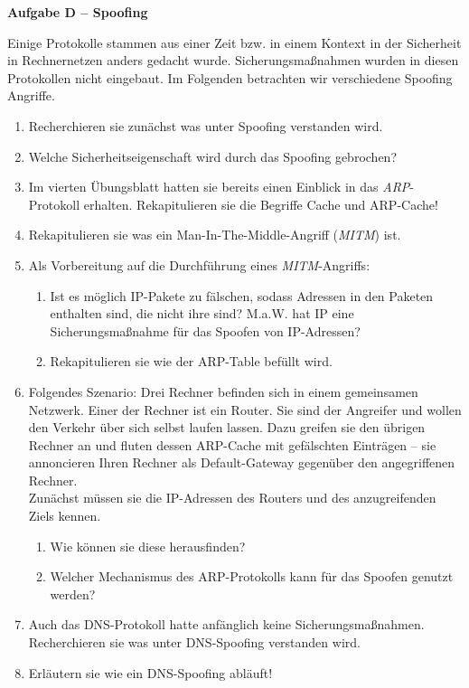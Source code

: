 \documentclass[paper=a4,fontsize=11pt]{scrartcl}%
\numberwithin{equation}{section}
\begin{document}
\begin{center}\Large{\textbf{Aufgabe D -- Spoofing}}\end{center}\vskip0.25in
Einige Protokolle stammen aus einer Zeit bzw. in einem Kontext in der Sicherheit in Rechnernetzen anders gedacht wurde. Sicherungsmaßnahmen wurden in diesen Protokollen nicht eingebaut. Im  Folgenden betrachten wir verschiedene Spoofing Angriffe.

\begin{enumerate}
	\item Recherchieren sie zunächst was unter Spoofing verstanden wird.
	\item Welche Sicherheitseigenschaft wird durch das Spoofing gebrochen?
	\item Im vierten Übungsblatt hatten sie bereits einen Einblick in das \emph{ARP}-Protokoll erhalten. Rekapitulieren sie die Begriffe Cache und ARP-Cache!
	\item Rekapitulieren sie was ein Man-In-The-Middle-Angriff (\emph{MITM}) ist.
	\item Als Vorbereitung auf die Durchführung eines \emph{MITM}-Angriffs:
	\begin{enumerate}
		\item Ist es möglich IP-Pakete zu fälschen, sodass Adressen in den Paketen enthalten sind, die nicht ihre sind? M.a.W. hat IP eine Sicherungsmaßnahme für das Spoofen von IP-Adressen?
		\item Rekapitulieren sie wie der ARP-Table befüllt wird.
	\end{enumerate}
	\item Folgendes Szenario: Drei Rechner befinden sich in einem gemeinsamen Netzwerk. Einer der Rechner ist ein Router. Sie sind der Angreifer und wollen den Verkehr über sich selbst laufen lassen. Dazu greifen sie den übrigen Rechner an und fluten dessen ARP-Cache mit gefälschten Einträgen -- sie annoncieren Ihren Rechner als Default-Gateway gegenüber den angegriffenen Rechner.\\
	Zunächst müssen sie die IP-Adressen des Routers und des anzugreifenden Ziels kennen.
	\begin{enumerate}
		\item Wie können sie diese herausfinden?
		\item Welcher Mechanismus des ARP-Protokolls kann für das Spoofen genutzt werden?
\end{enumerate}
	\item Auch das DNS-Protokoll hatte anfänglich keine Sicherungsmaßnahmen. Recherchieren sie was unter DNS-Spoofing verstanden wird.
	\item Erläutern sie wie ein DNS-Spoofing abläuft!
\end{enumerate}
\end{document}
